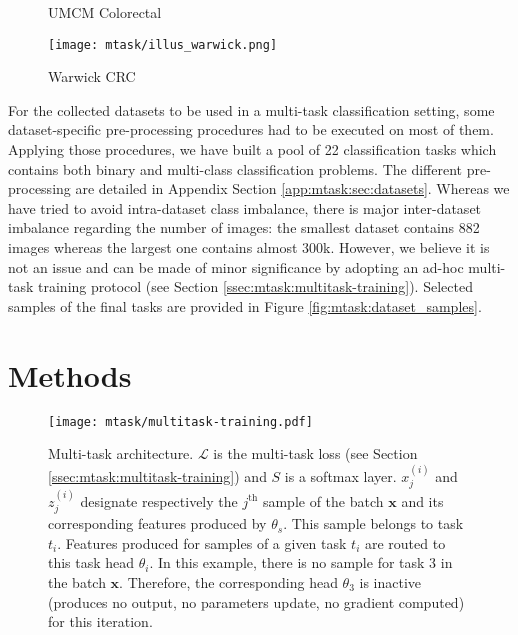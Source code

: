 \begin{figure*}
\begin{subfigure}[t]{0.115\textwidth}
        \caption{UMCM Colorectal}
    \end{subfigure}
    \begin{subfigure}[t]{0.115\textwidth}
        \centering
        \texttt{[image: mtask/illus\_warwick.png]}
        \caption{Warwick CRC}
    \end{subfigure}
    \caption{Overview of our final classification tasks (the display size does not reflect actual image size). In this figure, we provide only one set of selected samples for Breast1 and Breast2 as their corresponding tasks are similar and they originate both from the same set of WSIs.}
    \label{fig:mtask:dataset_samples}
\end{figure*}

For the collected datasets to be used in a multi-task classification setting, some dataset-specific pre-processing procedures had to be executed on most of them. Applying those procedures, we have built a pool of 22 classification tasks which contains both binary and multi-class classification problems. The different pre-processing are detailed in Appendix Section \ref{app:mtask:sec:datasets}. Whereas we have tried to avoid intra-dataset class imbalance, there is major inter-dataset imbalance regarding the number of images: the smallest dataset contains 882 images whereas the largest one contains almost 300k. However, we believe it is not an issue and can be made of minor significance by adopting an ad-hoc multi-task training protocol (see Section \ref{ssec:mtask:multitask-training}). Selected samples of the final tasks are provided in Figure \ref{fig:mtask:dataset_samples}. 

\section{Methods}
\label{sec:mtask:methods}

\begin{figure}
    \centering
    \texttt{[image: mtask/multitask-training.pdf]}
    \caption{Multi-task architecture. $\mathcal{L}$ is the multi-task loss (see Section \ref{ssec:mtask:multitask-training}) and $S$ is a softmax layer. $x_j^{(i)}$ and $z_j^{(i)}$ designate respectively the $j^{\text{th}}$ sample of the batch $\mathbf{x}$ and its corresponding features produced by $\theta_s$. This sample belongs to task $t_i$. Features produced for samples of a given task $t_i$ are routed to this task head $\theta_i$. In this example, there is no sample for task 3 in the batch $\mathbf{x}$. Therefore, the corresponding head $\theta_3$ is inactive (\ie produces no output, no parameters update, no gradient computed) for this iteration.}
    \label{fig:mtask:multitask-training}
\end{figure}


